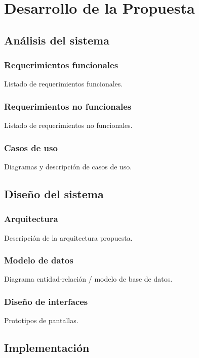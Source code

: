 \chapter{Desarrollo de la Propuesta}
\label{cap:desarrollo}

\section{Análisis del sistema}

\subsection{Requerimientos funcionales}
Listado de requerimientos funcionales.

\subsection{Requerimientos no funcionales}
Listado de requerimientos no funcionales.

\subsection{Casos de uso}
Diagramas y descripción de casos de uso.

\section{Diseño del sistema}

\subsection{Arquitectura}
Descripción de la arquitectura propuesta.

\subsection{Modelo de datos}
Diagrama entidad-relación / modelo de base de datos.

\subsection{Diseño de interfaces}
Prototipos de pantallas.

\section{Implementación}

